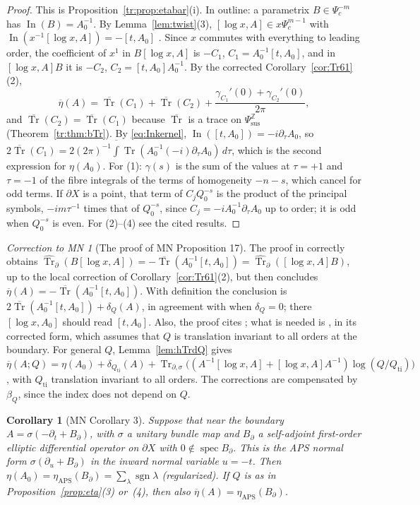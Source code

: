 \documentclass[11pt,oneside,reqno]{article}
\DeclareMathOperator{\Tr}{Tr}
\DeclareMathOperator{\In}{In}
\DeclareMathOperator{\sgn}{sgn}
\newcommand{\Z}{\mathbb Z}
\newcommand{\Psic}{\Psi_{c}}
\newcommand{\Psis}{\Psi_{\mathrm{sus}}}
\newcommand{\Trds}{\Tr_{\partial,\sigma}}
\newcommand{\hTrd}{\widehat{\Tr}_\partial}
\newcommand{\bTr}{\overline{\Tr}}
\newcommand{\lx}{\log x}
\newcommand{\etab}{\overline\eta}
\theoremstyle{plain}
\newtheorem{corollary}[theorem]{Corollary}
\theoremstyle{definition}
\theoremstyle{remark}
\newtheorem{correction}[theorem]{Correction to MN}
\begin{document}
\begin{proof}
This is Proposition~\ref{tr:prop:etabar}(i). In outline: a parametrix
\(B\in\Psic^{-m}\) has \(\In(B)=A_0^{-1}\). By
Lemma~\ref{lem:twist}(3), \([\lx,A]\in x\Psic^{m-1}\) with
\(\In(x^{-1}[\lx,A])=-[t,A_0]\) \cite[(95)]{MN}. Since \(x\) commutes with
everything to leading order, the coefficient of \(x^1\) in \(B[\lx,A]\) is
\(-C_1\), \(C_1=A_0^{-1}[t,A_0]\), and in \([\lx,A]B\) it is \(-C_2\),
\(C_2=[t,A_0]A_0^{-1}\). By the corrected Corollary~\ref{cor:Tr61}(2),
\[
 \etab(A)=\bTr(C_1)+\bTr(C_2)+\frac{\gamma_{C_1}'(0)+\gamma_{C_2}'(0)}{2\pi},
\]
and \(\bTr(C_2)=\bTr(C_1)\) because \(\bTr\) is a trace on \(\Psis^{\Z}\)
(Theorem~\ref{tr:thm:bTr}). By \eqref{eq:Inkernel},
\(\In([t,A_0])=-i\partial_\tau A_0\), so \(2\bTr(C_1)=2(2\pi)^{-1}
\overline\int\Tr(A_0^{-1}(-i)\partial_\tau A_0)\,d\tau\), which is the
second expression for \(\eta(A_0)\). For (1): \(\gamma(s)\) is the sum of
the values at \(\tau=+1\) and \(\tau=-1\) of the fibre integrals of the
terms of homogeneity \(-n-s\), which cancel for odd terms. If
\(\partial X\) is a point, that term of \(C_jQ_0^{-s}\) is the product of
the principal symbols, \(-im\tau^{-1}\) times that of \(Q_0^{-s}\), since
\(C_j=-iA_0^{-1}\partial_\tau A_0\) up to order; it is odd when
\(Q_0^{-s}\) is even. For (2)--(4) see the cited results.
\end{proof}

\begin{correction}[The proof of MN Proposition 17]\label{corr:eta}
The proof in \cite{MN} correctly obtains
\(\hTrd(B[\lx,A])=-\bTr(A_0^{-1}[t,A_0])=\hTrd([\lx,A]B)\), up to the local
correction of Corollary~\ref{cor:Tr61}(2), but then
concludes \(\etab(A)=-\bTr(A_0^{-1}[t,A_0])\). With definition
\cite[(89)]{MN} the conclusion is \(2\bTr(A_0^{-1}[t,A_0])+\delta_Q(A)\), in
agreement with \cite[(24)]{MN} when \(\delta_Q=0\); there \([\lx,A_0]\)
should read \([t,A_0]\). Also,
the proof cites \cite[(54)]{MN}; what is needed is \cite[Cor.~2]{MN},
in its corrected form, which assumes that \(Q\) is translation invariant to
all orders at the boundary. For
general \(Q\), Lemma~\ref{lem:hTrdQ} gives
\(\etab(A;Q)=\eta(A_0)+\delta_{Q_{\mathrm{ti}}}(A)+\Trds\bigl((A^{-1}[\lx,A]
+[\lx,A]A^{-1})\log(Q/Q_{\mathrm{ti}})\bigr)\), with \(Q_{\mathrm{ti}}\)
translation invariant to all orders. The corrections are compensated by
\(\beta_Q\), since the index does not depend on \(Q\).
\end{correction}

\begin{corollary}[MN Corollary 3]\label{cor:Dirac}
Suppose that near the boundary \(A=\sigma(-\partial_t+B_\partial)\), with
\(\sigma\) a unitary bundle map and \(B_\partial\) a self-adjoint first-order
elliptic differential operator on \(\partial X\) with
\(0\notin\operatorname{spec}B_\partial\). This is the
APS normal form \(\sigma(\partial_u+B_\partial)\) in the inward normal
variable \(u=-t\). Then \(\eta(A_0)=\eta_{\mathrm{APS}}(B_\partial)=
\sum_\lambda\sgn\lambda\) (regularized). If \(Q\) is as in
Proposition~\ref{prop:eta}(3) or~(4), then also \(\etab(A)=
\eta_{\mathrm{APS}}(B_\partial)\).
\end{corollary}
\end{document}
